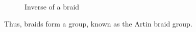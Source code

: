 \documentclass[10pt]{beamer}
\theoremstyle{definition}
\newcommand{\I}{\mathbfbb{I}}
\begin{document}
\begin{frame}
\begin{figure}
{\begin{tikzpicture}[scale=1]
				\end{tikzpicture}\label{fig:braidinverse3}}
%
%
			\caption{Inverse of a braid}\label{fig:braidinverse}
		\end{figure}
	\end{frame}

	\begin{frame}
	    Thus, braids form a group, known as the Artin braid group.
	\end{frame}
\end{document}
